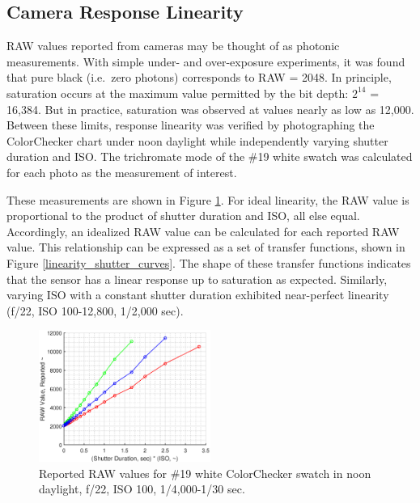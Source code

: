 \documentclass[twocolumn,10pt]{asme2ej}
\newcommand{\id}{\hspace{6 mm}}
\begin{document}
\subsection{Camera Response Linearity}
\label{Camera Sensor Linearity}

RAW values reported from cameras may be thought of as photonic measurements. With simple under- and over-exposure experiments, it was found that pure black (i.e.\ zero photons) corresponds to RAW = 2048. In principle, saturation occurs at the maximum value permitted by the bit depth: $2^{14}$ = 16,384. But in practice, saturation was observed at values nearly as low as 12,000. Between these limits, response linearity was verified by photographing the ColorChecker chart under noon daylight while independently varying shutter duration and ISO. The trichromate mode of the \#19 white swatch was calculated for each photo as the measurement of interest.

\id These measurements are shown in Figure \ref{linearity_shutter_data}. For ideal linearity, the RAW value is proportional to the product of shutter duration and ISO, all else equal. Accordingly, an idealized RAW value can be calculated for each reported RAW value. This relationship can be expressed as a set of transfer functions, shown in Figure \ref{linearity_shutter_curves}. The shape of these transfer functions indicates that the sensor has a linear response up to saturation as expected. Similarly, varying ISO with a constant shutter duration exhibited near-perfect linearity (f/22, ISO 100-12,800, 1/2,000 sec).

\begin{figure}
\centering
\includegraphics[width=0.5\textwidth]{linearity_shutter_data.eps}
\caption{Reported RAW values for \#19 white ColorChecker swatch in noon daylight, f/22, ISO 100, 1/4,000-1/30 sec.}
\label{linearity_shutter_data}
\end{figure}
\end{document}
